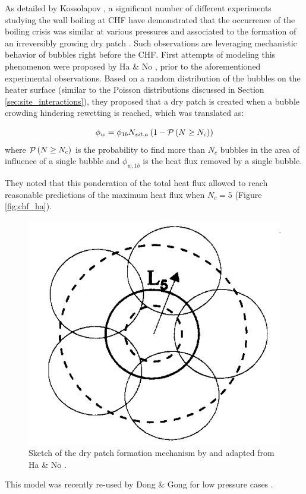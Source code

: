 As detailed by Kossolapov \cite{kossolapov_experimental_2021}, a significant number of different experiments studying the wall boiling at CHF have demonstrated that the occurrence of the boiling crisis was similar at various pressures and associated to the formation of an irreversibly growing dry patch \cite{kossolapov_experimental_2021, richenderfer_experimental_2018}. Such observations are leveraging mechanistic behavior of bubbles right before the CHF. First attempts of modeling this phenomenon were proposed by Ha \& No \cite{ha_dry-spot_1998}, prior to the aforementioned experimental observations. Based on a random distribution of the bubbles on the heater surface (similar to the Poisson distributions discussed in Section \ref{sec:site_interactions}), they proposed that a dry patch is created when a bubble crowding hindering rewetting is reached, which was translated as:

\begin{equation}
\phi_{w} = \phi_{1b}N_{sit,a} \left( 1 - \mathcal{P}\left( N \geq N_{c} \right) \right)
\end{equation}
where $\mathcal{P}\left( N \geq N_{c} \right)$ is the probability to find more than $N_{c}$ bubbles in the area of influence of a single bubble and $\phi_{w,1b}$ is the heat flux removed by a single bubble.

\npar

They noted that this ponderation of the total heat flux allowed to reach reasonable predictions of the maximum heat flux when $N_{c}=5$ (Figure \ref{fig:chf_ha}).



\begin{figure}[!h]
\centering
\includegraphics[width=0.35\linewidth]{img/chf/chf_ha.png}
\caption{Sketch of the dry patch formation mechanism by and adapted from Ha \& No \cite{ha_dry-spot_1998}.}
\label{fig:chf_weisman}
\end{figure}


This model was recently re-used by Dong \& Gong for low pressure cases \cite{dong_numerical_2022}.



